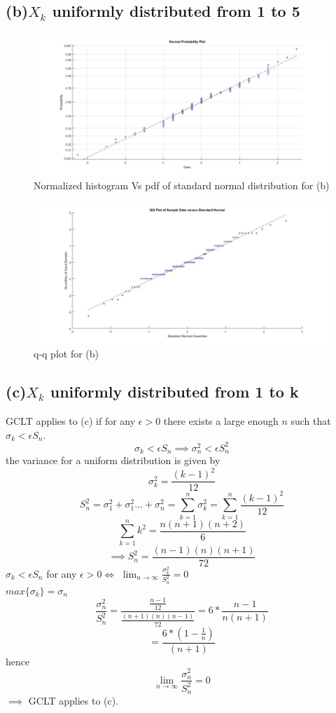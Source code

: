 \documentclass[a4paper,11pt]{article}
\begin{document}
\subsection*{(b)\quad $X_k$ uniformly distributed from 1 to 5}

\begin{figure}[h]
   \hspace*{-4cm}
    \includegraphics[scale=0.4]{q2_b_1}
    \caption{Normalized histogram Vs pdf of standard normal distribution for (b)}\label{fig:q2_b_1}
\end{figure}
\begin{figure}[h]
   \hspace*{-4cm}
    \includegraphics[scale=0.4]{q2_b_2}
    \caption{q-q plot for (b)}\label{fig:q2_b_2}
\end{figure}
\newpage
\clearpage
\subsection*{(c)\quad $X_k$ uniformly distributed from 1 to k}
GCLT applies to (c) if for any $\epsilon >0$ there exists a large enough $n$ such that $\sigma_k<\epsilon S_n$.
$$\sigma_k<\epsilon S_n \implies \sigma_n^2<\epsilon S_n^2$$
the variance for a uniform distribution is given by $$\sigma_k^2 = \frac{(k-1)^2}{12}$$ 
$$S_n^2 = \sigma_1^2 + \sigma_1^2 \dots + \sigma_n^2=\sum_{k=1}^{n}\sigma_k^2=\sum_{k=1}^{n} \frac{(k-1)^2}{12}$$
$$\sum_{k=1}^{n}k^2 = \frac{n(n+1)(n+2)}{6}$$
$$\implies S_n^2 = \frac{(n-1)(n)(n+1)}{72}$$
$\sigma_k<\epsilon S_n$ for any $\epsilon >0$$ \iff $ $\lim_{n \to \infty}\frac{\sigma_k^2}{S_n^2}=0$\\
$max\{\sigma_k\} = \sigma_n$\\
$$\frac{\sigma_n^2}{S_n^2}=\frac{\frac{n-1}{12}}{\frac{(n+1)(n)(n-1)}{72}}=6*\frac{n-1}{n(n+1)}$$
$$=\frac{6*(1-\frac{1}{n})}{(n+1)}$$
hence $$\lim_{n \to \infty }\frac{\sigma_n^2}{S_n^2}=0$$
$\implies$ GCLT applies to (c).
\end{document}

